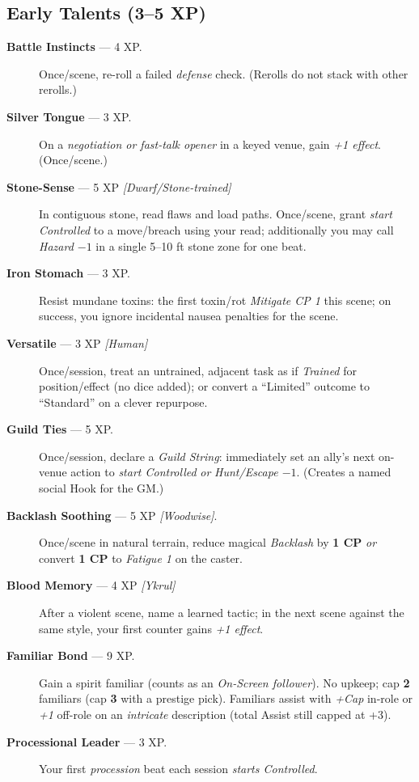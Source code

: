 \documentclass[11pt]{article}
\begin{document}
\subsection*{Early Talents (3–5 XP)}
\begin{description}
  \item[\textbf{Battle Instincts} — 4 XP.] Once/scene, re-roll a failed \emph{defense} check. (Rerolls do not stack with other rerolls.)
  \item[\textbf{Silver Tongue} — 3 XP.] On a \emph{negotiation or fast-talk opener} in a keyed venue, gain \emph{+1 effect}. (Once/scene.)
  \item[\textbf{Stone-Sense} — 5 XP \emph{[Dwarf/Stone-trained]}] In contiguous stone, read flaws and load paths. Once/scene, grant \emph{start Controlled} to a move/breach using your read; additionally you may call \emph{Hazard $-1$} in a single 5–10 ft stone zone for one beat.
  \item[\textbf{Iron Stomach} — 3 XP.] Resist mundane toxins: the first toxin/rot \emph{Mitigate CP 1} this scene; on success, you ignore incidental nausea penalties for the scene.
  \item[\textbf{Versatile} — 3 XP \emph{[Human]}] Once/session, treat an untrained, adjacent task as if \emph{Trained} for position/effect (no dice added); or convert a “Limited” outcome to “Standard” on a clever repurpose.
  \item[\textbf{Guild Ties} — 5 XP.] Once/session, declare a \emph{Guild String}: immediately set an ally’s next on-venue action to \emph{start Controlled} \emph{or} \emph{Hunt/Escape $-1$}. (Creates a named social Hook for the GM.)
  \item[\textbf{Backlash Soothing} — 5 XP \emph{[Woodwise]}.] Once/scene in natural terrain, reduce magical \emph{Backlash} by \textbf{1 CP} \emph{or} convert \textbf{1 CP} to \emph{Fatigue 1} on the caster.
  \item[\textbf{Blood Memory} — 4 XP \emph{[Ykrul]}] After a violent scene, name a learned tactic; in the next scene against the same style, your first counter gains \emph{+1 effect}.
  \item[\textbf{Familiar Bond} — 9 XP.] Gain a spirit familiar (counts as an \emph{On-Screen follower}). No upkeep; cap \textbf{2} familiars (cap \textbf{3} with a prestige pick). Familiars assist with \emph{+Cap} in-role or \emph{+1} off-role on an \emph{intricate} description (total Assist still capped at +3).
  \item[\textbf{Processional Leader} — 3 XP.] Your first \emph{procession} beat each session \emph{starts Controlled}.

\end{description}
\end{document}
